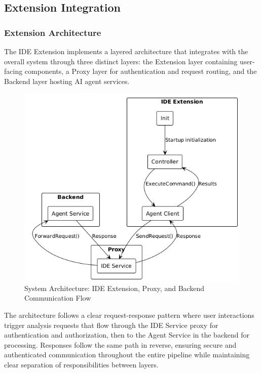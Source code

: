 \begin{spacing}{1.2}
\subsection{Extension Integration}

\subsubsection{Extension Architecture}
The IDE Extension implements a layered architecture that integrates with the overall system through three distinct layers: the Extension layer containing user-facing components, a Proxy layer for authentication and request routing, and the Backend layer hosting AI agent services.

\begin{figure}[H]
    \centering
    \includegraphics[scale=0.6]{Images/extension_integration.png}
    \caption{System Architecture: IDE Extension, Proxy, and Backend Communication Flow}
    \label{fig:high_level_frontend_architecture}
\end{figure}

The architecture follows a clear request-response pattern where user interactions trigger analysis requests that flow through the IDE Service proxy for authentication and authorization, then to the Agent Service in the backend for processing. Responses follow the same path in reverse, ensuring secure and authenticated communication throughout the entire pipeline while maintaining clear separation of responsibilities between layers.


\end{spacing}
